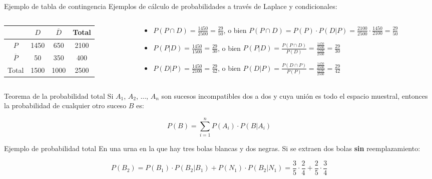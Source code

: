 \documentclass[11pt,handout]{beamer}
\begin{document}
\begin{frame}{Ejemplo de tabla de contingencia}
Ejemplos de cálculo de probabilidades a través de Laplace y condicionales:
\begin{columns}
\begin{column}{0.41\textwidth}
     \begin{tabular}{|c | c | c | c |} 
     \hline
      &  $D$ & $\overline{D}$ & Total \\ [0.5ex] 
     \hline
     $P$ & \color{red}1450 & \color{red}650 & 2100 \\ 
     \hline
     $\overline{P}$ & \color{red}50  & 350 & \color{red}400 \\
     \hline
     Total & 1500 & \color{red}1000 &  2500 \\
     \hline
    \end{tabular}
\end{column}
\begin{column}{0.65\textwidth}  
\begin{itemize}[<+->]
    \item $P(P \cap D)= \frac{1450}{2500}=\frac{29}{50}$, o bien $P(P \cap D)= P(P)\cdot P(D|P)=\frac{2100}{2500}\cdot \frac{1450}{2100}=\frac{29}{50}$
    \item $P(P|D)=\frac{1450}{1500}=\frac{29}{30}$, o bien $P(P|D)=\frac{P(P \cap D)}{P(D)} =\frac{\frac{1450}{2500}}{\frac{1500}{2500}}=\frac{29}{30}$
    \item $P(D|P)=\frac{1450}{2100}=\frac{29}{42}$, o bien $P(D|P)= \frac{P(D \cap P)}{P(P)} =\frac{\frac{1450}{2500}}{\frac{2100}{2500}}=\frac{29}{42}$
\end{itemize}
\end{column}
\end{columns}
\end{frame}

\begin{frame}{Teorema de la probabilidad total}
Si $A_1$, $A_2$, ..., $A_n$   son sucesos incompatibles dos a dos y cuya unión es todo el espacio muestral, entonces la probabilidad de cualquier otro suceso $B$ es:
\begin{block}{}
$$P(B)=\sum_{i=1}^n P(A_i)\cdot  P(B|A_i) $$
\end{block}

\end{frame}

\begin{frame}{Ejemplo de probabilidad total}
En una urna en la que hay tres bolas blancas y dos negras. Si se extraen dos bolas \textbf{sin} reemplazamiento:

\pause
$$P(B_2)=P(B_1)\cdot P(B_2|B_1) + P(N_1)\cdot P(B_2|N_1)
= \frac{3}{5}\cdot\frac{2}{4} + \frac{2}{5}\cdot\frac{3}{4}$$
\end{frame}
\end{document}
